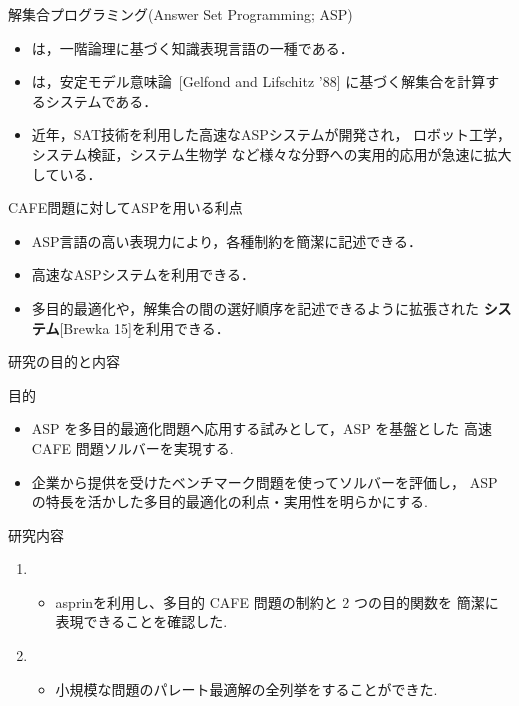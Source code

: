 \documentclass[dvipdfmx, 11pt]{beamer}
\begin{document}
\begin{frame}{解集合プログラミング(Answer Set Programming; ASP)}
 \begin{itemize}
 \item {}は，一階論理に基づく知識表現言語の一種である．
 \item {}は，安定モデル意味論~[Gelfond and Lifschitz '88]
   に基づく解集合を計算するシステムである．
 \item 近年，SAT技術を利用した高速なASPシステムが開発され，
   ロボット工学，システム検証，システム生物学
   など様々な分野への実用的応用が急速に拡大している．
 \end{itemize}
\vfill
 \begin{alertblock}{CAFE問題に対してASPを用いる利点}
   \begin{itemize} 
    \item ASP言語の高い表現力により，各種制約を簡潔に記述できる．
    \item 高速なASPシステムを利用できる．
    \item 多目的最適化や，解集合の間の選好順序を記述できるように拡張された
	  \alert{\bf {\asprin}システム}[Brewka 15]を利用できる．
   \end{itemize}
 \end{alertblock}
\end{frame}
\begin{frame}{研究の目的と内容}
  \begin{alertblock}{目的}
   \begin{itemize}
    \item ASP を多目的最適化問題へ応用する試みとして，ASP を基盤とした
	  高速 CAFE 問題ソルバーを実現する.
    \item 企業から提供を受けたベンチマーク問題を使ってソルバーを評価し， 
	  ASP の特長を活かした多目的最適化の利点・実用性を明らかにする.
   \end{itemize}
  \end{alertblock}
  \vfill
  \begin{block}{研究内容}
    \begin{enumerate}
    \item {}
      \begin{itemize}
       \item asprinを利用し、多目的 CAFE 問題の制約と 2 つの目的関数を
	     簡潔に表現できることを確認した.
      \end{itemize}
    \item {}
      \begin{itemize}
       \item 小規模な問題のパレート最適解の全列挙をすることができた.
      \end{itemize}
  \end{enumerate}
 \end{block}
\end{frame}
\end{document}

